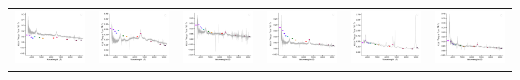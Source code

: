 \begin{center}
\begin{longtable}{l l l l l l }
    \includegraphics[width=0.3\linewidth, clip]{Figs/Figs-sdss/spec-9383-58097-0530-STRIPE82-0047-031879.pdf} & \includegraphics[width=0.3\linewidth, clip]{Figs/Figs-sdss/spec-9403-58018-0690-STRIPE82-0002-034805.pdf} & \includegraphics[width=0.3\linewidth, clip]{Figs/Figs-sdss/spec-9405-58048-0414-STRIPE82-0009-022679.pdf} & \includegraphics[width=0.3\linewidth, clip]{Figs/Figs-sdss/spec-9406-58067-0121-STRIPE82-0007-021121.pdf} & \includegraphics[width=0.3\linewidth, clip]{Figs/Figs-sdss/spec-9406-58067-0648-STRIPE82-0006-027457.pdf} & \includegraphics[width=0.3\linewidth, clip]{Figs/Figs-sdss/spec-9406-58067-0764-STRIPE82-0008-036347.pdf} \\

\end{longtable}
\end{center}
